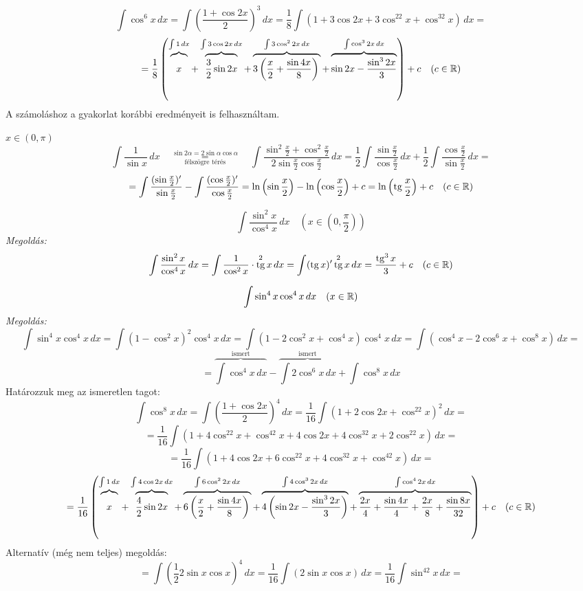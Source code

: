 \documentclass[a4paper,11.5pt]{article}
\DeclareMathOperator{\tg}{tg}
\begin{document}
	\begin{exercise}
		\def\fracHeight{\vphantom{\frac{3^2}{2}}}
		\[\int\cos^6x\,dx=\int\left(\frac{1+\cos2x}{2}\right)^3\,dx=\frac{1}{8}\int(1+3\cos2x+3\cos^22x+\cos^32x)\,dx=\]
		\[= \frac{1}{8}\left(\overbrace{x\fracHeight}^{\int1\,dx}+\overbrace{\frac{3}{2}\sin2x\fracHeight}^{\int3\cos2x\,dx}+ \overbrace{3\left(\frac{x}{2}+\frac{\sin4x}{8}\right)\fracHeight}^{\int3\cos^22x\,dx}+ \overbrace{\sin2x-\frac{\sin^32x}{3}}^{\int\cos^32x\,dx}\right)+c\quad (c\in\R)  \]
		A számoláshoz a gyakorlat korábbi eredményeit is felhasználtam.
	\end{exercise}
	\begin{task}$x\in(0,\pi)$
		\[\int\frac{1}{\sin x}\,dx\quad \overset{\sin2\alpha=2\sin\alpha\cos\alpha}{\underset{\text{félszögre térés}}{=}}\quad \int\frac{\sin^2\frac{x}{2}+\cos^2\frac{x}{2}}{2\sin\frac{x}{2}\cos\frac{x}{2}}\,dx=\frac{1}{2}\int\frac{\sin\frac{x}{2}}{\cos\frac{x}{2}}\,dx+\frac{1}{2}\int\frac{\cos\frac{x}{2}}{\sin\frac{x}{2}}\,dx=\]
		\[=\int\frac{(\sin\frac{x}{2})'}{\sin\frac{x}{2}}-\int\frac{(\cos\frac{x}{2})'}{\cos\frac{x}{2}}=\ln\left(\sin\frac{x}{2}\right)-\ln\left(\cos\frac{x}{2}\right)+c=\ln\left(\tg\frac{x}{2}\right)+c\quad (c\in\R) \]
	\end{task}
	\begin{exercise}
		\[ \int\frac{\sin^2x}{\cos^4x}\,dx\quad \left(x\in\left(0,\frac{\pi}{2}\right)\right) \]
		\textit{Megoldás:}
		\[ \int\frac{\sin^2x}{\cos^4x}\,dx=\int\frac{1}{\cos^2x}\cdot\tg^2x\,dx= \int(\tg x)'\tg^2x\,dx=\frac{\tg^3x}{3}+c\quad (c\in\R) \]
	\end{exercise}
	\begin{exercise}
		\[ \int\sin^4x\cos^4x\,dx \quad (x\in\mathbb{R}) \]
		\textit{Megoldás:}
		\[ \int\sin^4x\cos^4x\,dx=\int(1-\cos^2x)^2\cos^4x\,dx=\int(1-2\cos^2x+\cos^4x)\cos^4x\,dx=\int(\cos^4x-2\cos^6x+\cos^8x)\,dx=\]
		\[ =\overbrace{\int\cos^4x\,dx}^{\text{ismert}}-\overbrace{\int2\cos^6x\,dx}^{\text{ismert}}+\int\cos^8x\,dx \]
		Határozzuk meg az ismeretlen tagot:
		\[ \int\cos^8x\,dx=\int\left(\frac{1+\cos2x}{2}\right)^4\,dx=\frac{1}{16}\int(1+2\cos2x+\cos^22x)^2\,dx=\]
		\[=\frac{1}{16}\int\left(1+4\cos^22x+\cos^42x+4\cos2x+4\cos^32x+2\cos^22x\right)\,dx=\]
		\[=\frac{1}{16}\int\left(1+4\cos2x+6\cos^22x+4\cos^32x+\cos^42x\right)\,dx=\]
		\def\fracHeight{\vphantom{\frac{3^2}{2}}}
		\[= \frac{1}{16}\left(\overbrace{x\fracHeight}^{\int1\,dx}+\overbrace{\frac{4}{2}\sin2x\fracHeight}^{\int4\cos2x\,dx}+ \overbrace{6\left(\frac{x}{2}+\frac{\sin4x}{8}\right)\fracHeight}^{\int6\cos^22x\,dx}+ \overbrace{4\left(\sin2x-\frac{\sin^32x}{3}\right)}^{\int4\cos^32x\,dx}+\overbrace{\frac{2x}{4}+\frac{\sin4x}{4}+\frac{2x}{8}+\frac{\sin8x}{32}\fracHeight}^{\int\cos^42x\,dx}\right)+c\quad (c\in\R)  \]
		Alternatív (még nem teljes) megoldás:
		\[=\int\left(\frac{1}{2}2\sin x\cos x\right)^4\,dx=\frac{1}{16}\int\left(2\sin x\cos x\right)\,dx=\frac{1}{16}\int\sin^42x\,dx= \]
	\end{exercise}
\end{document}
